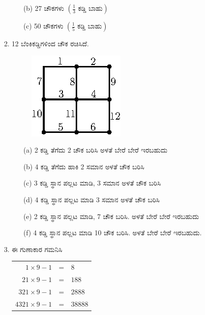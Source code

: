 \begin{enumerate}
\begin{itemize}
\smallskip

\item[(b)] 27 ಚೌಕಗಳು $\left(\frac{1}{3} \text{ ಕಡ್ಡಿ ಬಾಹು}\right)$

\smallskip

\item[(c)] 50 ಚೌಕಗಳು $\left(\frac{1}{5} \text{ ಕಡ್ಡಿ ಬಾಹು}\right)$
\end{itemize}

\item 12 ಬೆಂಕಿಕಡ್ಡಿಗಳಿಂದ ಚೌಕ ರಚಿಸಿದೆ. 

\vskip -0.2cm

\begin{figure}[H]
\centering
\includegraphics[scale=1.3]{images/chap7/q12.eps}
\end{figure}

\begin{itemize}
\item[(a)] 2 ಕಡ್ಡಿ ತೆಗೆದು 2 ಚೌಕ ಬರಿಸಿ ಅಳತೆ ಬೇರೆ ಬೇರೆ ಇರಬಹುದು 
\item[(b)] 4 ಕಡ್ಡಿ ತೆಗೆದು ಹಾಕಿ 2 ಸಮಾನ ಅಳತೆ ಚೌಕ ಬರಿಸಿ 
\item[(c)] 3 ಕಡ್ಡಿ ಸ್ಥಾನ ಪಲ್ಲಟ ಮಾಡಿ, 3 ಸಮಾನ ಅಳತೆ ಚೌಕ ಬರಿಸಿ 
\item[(d)] 4 ಕಡ್ಡಿ ಸ್ಥಾನ ಪಲ್ಲಟ ಮಾಡಿ 3 ಸಮಾನ ಅಳತೆ ಚೌಕ ಬರಿಸಿ 
\item[(e)] 2 ಕಡ್ಡಿ ಸ್ಥಾನ ಪಲ್ಲಟ ಮಾಡಿ, 7 ಚೌಕ ಬರಿಸಿ. ಅಳತೆ ಬೇರೆ ಬೇರೆ ಇರಬಹುದು 
\item[(f)] 4 ಕಡ್ಡಿ ಸ್ಥಾನ ಪಲ್ಲಟ ಮಾಡಿ 10 ಚೌಕ ಬರಿಸಿ. ಅಳತೆ ಬೇರೆ ಬೇರೆ ಇರಬಹುದು. 
\end{itemize}

\item ಈ ಗುಣಾಕಾರ ಗಮನಿಸಿ 

\begin{tabular}[t]{rcl}
$1\times 9 - 1$& = & $8$\\
$21\times 9 - 1$& = & $188$\\
$321\times 9 - 1$& = & $2888$\\
$4321\times 9 - 1$& = & $38888$\\
\end{tabular}


\end{enumerate}
